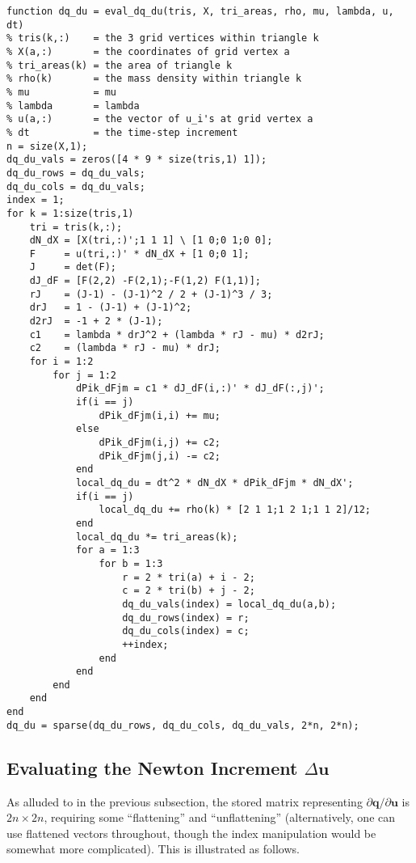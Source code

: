 \documentclass{article}
\begin{document}
\begin{verbatim}
function dq_du = eval_dq_du(tris, X, tri_areas, rho, mu, lambda, u, dt)
% tris(k,:)    = the 3 grid vertices within triangle k
% X(a,:)       = the coordinates of grid vertex a
% tri_areas(k) = the area of triangle k
% rho(k)       = the mass density within triangle k
% mu           = mu
% lambda       = lambda
% u(a,:)       = the vector of u_i's at grid vertex a
% dt           = the time-step increment
n = size(X,1);
dq_du_vals = zeros([4 * 9 * size(tris,1) 1]);
dq_du_rows = dq_du_vals;
dq_du_cols = dq_du_vals;
index = 1;
for k = 1:size(tris,1)
    tri = tris(k,:);
    dN_dX = [X(tri,:)';1 1 1] \ [1 0;0 1;0 0];
    F     = u(tri,:)' * dN_dX + [1 0;0 1];
    J     = det(F);
    dJ_dF = [F(2,2) -F(2,1);-F(1,2) F(1,1)];
    rJ    = (J-1) - (J-1)^2 / 2 + (J-1)^3 / 3;
    drJ   = 1 - (J-1) + (J-1)^2;
    d2rJ  = -1 + 2 * (J-1);
    c1    = lambda * drJ^2 + (lambda * rJ - mu) * d2rJ;
    c2    = (lambda * rJ - mu) * drJ;
    for i = 1:2
        for j = 1:2
            dPik_dFjm = c1 * dJ_dF(i,:)' * dJ_dF(:,j)';
            if(i == j)
                dPik_dFjm(i,i) += mu;
            else
                dPik_dFjm(i,j) += c2;
                dPik_dFjm(j,i) -= c2;
            end
            local_dq_du = dt^2 * dN_dX * dPik_dFjm * dN_dX';
            if(i == j)
                local_dq_du += rho(k) * [2 1 1;1 2 1;1 1 2]/12;
            end
            local_dq_du *= tri_areas(k);
            for a = 1:3
                for b = 1:3
                    r = 2 * tri(a) + i - 2;
                    c = 2 * tri(b) + j - 2;
                    dq_du_vals(index) = local_dq_du(a,b);
                    dq_du_rows(index) = r;
                    dq_du_cols(index) = c;
                    ++index;
                end
            end
        end
    end
end
dq_du = sparse(dq_du_rows, dq_du_cols, dq_du_vals, 2*n, 2*n);
\end{verbatim}

\subsection{Evaluating the Newton Increment \(\Delta \mathbf{u}\)}

As alluded to in the previous subsection, the stored matrix representing \(\partial \mathbf{q} / \partial \mathbf{u}\) is \(2n \times 2n\), requiring some ``flattening'' and ``unflattening'' (alternatively, one can use flattened vectors throughout, though the index manipulation would be somewhat more complicated).  This is illustrated as follows.
\end{document}
